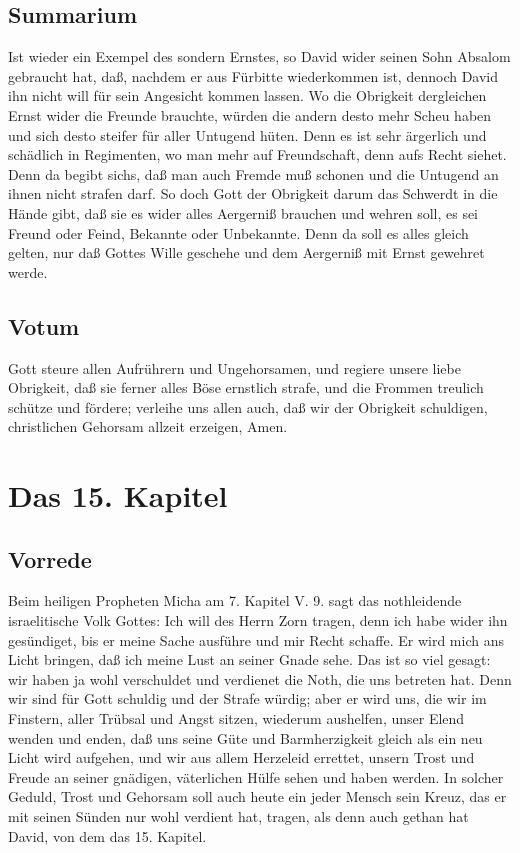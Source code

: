 \section{Summarium}

Ist wieder ein Exempel des sondern Ernstes, so David wider seinen Sohn Absalom gebraucht hat, daß, nachdem er aus Fürbitte wiederkommen ist, dennoch David ihn nicht will für sein Angesicht kommen lassen. Wo die Obrigkeit dergleichen Ernst wider die Freunde brauchte, würden die andern desto mehr Scheu haben und sich desto steifer für aller Untugend hüten. Denn es ist sehr ärgerlich und schädlich in Regimenten, wo man mehr auf Freundschaft, denn aufs Recht siehet. Denn da begibt sichs, daß man auch Fremde muß schonen und die Untugend an ihnen nicht strafen darf. So doch Gott der Obrigkeit darum das Schwerdt in die Hände gibt, daß sie es wider alles Aergerniß brauchen und wehren soll, es sei Freund oder Feind, Bekannte oder Unbekannte. Denn da soll es alles gleich gelten, nur daß Gottes Wille geschehe und dem Aergerniß mit Ernst gewehret werde.

\section{Votum}

Gott steure allen Aufrührern und Ungehorsamen, und regiere unsere liebe Obrigkeit, daß sie ferner alles Böse ernstlich strafe, und die Frommen treulich schütze und fördere; verleihe uns allen auch, daß wir der Obrigkeit schuldigen, christlichen Gehorsam allzeit erzeigen, Amen.

\chapter{Das 15. Kapitel}

\section{Vorrede}

Beim heiligen Propheten Micha am 7. Kapitel V. 9. sagt das nothleidende israelitische Volk Gottes: Ich will des Herrn Zorn tragen, denn ich habe wider ihn gesündiget, bis er meine Sache ausführe und mir Recht schaffe. Er wird mich ans Licht bringen, daß ich meine Lust an seiner Gnade sehe. Das ist so viel gesagt: wir haben ja wohl verschuldet und verdienet die Noth, die uns betreten hat. Denn wir sind für Gott schuldig und der Strafe würdig; aber er wird uns, die wir im Finstern, aller Trübsal und Angst sitzen, wiederum aushelfen, unser Elend wenden und enden, daß uns seine Güte und Barmherzigkeit gleich als ein neu Licht wird aufgehen, und wir aus allem Herzeleid errettet, unsern Trost und Freude an seiner gnädigen, väterlichen Hülfe sehen und haben werden. In solcher Geduld, Trost und Gehorsam soll auch heute ein jeder Mensch sein Kreuz, das er mit seinen Sünden nur wohl verdient hat, tragen, als denn auch gethan hat David, von dem das 15. Kapitel.

